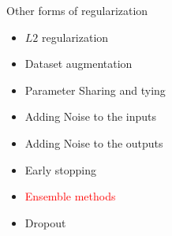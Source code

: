 \begin{frame}
\end{frame}

\begin{frame}
	\vspace{4em}
	\begin{overlayarea}{\textwidth}{\textheight}
		\begin{block}{Other forms of regularization}
			\begin{itemize}
				\item $L2$ regularization
				\item Dataset augmentation
				\item Parameter Sharing and tying
				\item Adding Noise to the inputs
				\item Adding Noise to the outputs 
				\item Early stopping
				\item \textcolor<2->{red}{Ensemble methods}
				\item Dropout
			\end{itemize}
		\end{block}
	\end{overlayarea}
\end{frame}

